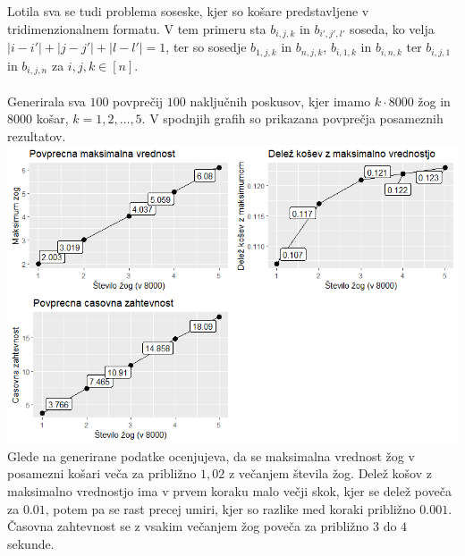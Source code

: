 \documentclass[a4paper, 11pt]{article}
\begin{document}
Lotila sva se tudi problema soseske, kjer so košare predstavljene v tridimenzionalnem formatu.
V tem primeru sta $b_{i,j,k} $ in $ b_{i',j',l'}$ soseda, ko velja $|i-i'|+|j-j'|+|l-l'| = 1$, ter so sosedje 
$b_{1,j,k} $ in $b_{n,j,k}$, $b_{i,1,k} $ in $b_{i,n,k}$ ter $b_{i,j,1} $ in $b_{i,j,n}$ za $i, j, k \in [n]$.
\\
\\
Generirala sva $100$ povprečij $100$ naključnih poskusov, kjer imamo $k \cdot 8000$ žog in $8000$ košar, $k=1,2, \dots, 5$. 
V spodnjih grafih so prikazana povprečja posameznih rezultatov. 
\bigbreak
\includegraphics[scale=0.65]{povprecje_3d.png}
\\
Glede na generirane podatke ocenjujeva, da se maksimalna vrednost žog v posamezni košari veča za približno $1,02$ z večanjem
števila žog. Delež košov z maksimalno vrednostjo ima v prvem koraku malo večji skok, kjer se delež poveča za 
$0.01$, potem pa se rast precej umiri, kjer so razlike med koraki približno $0.001$. Časovna zahtevnost se z vsakim večanjem žog poveča za približno $3$ do $4$ sekunde.
\end{document}
